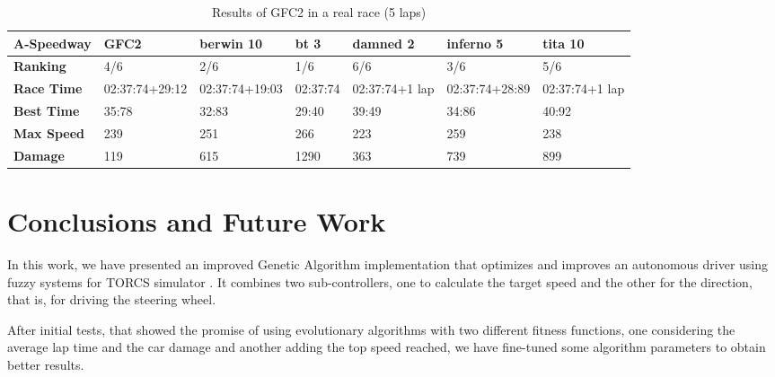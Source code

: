\documentclass[conference]{IEEEtran}
\begin{document}
\begin{table}[!ht]
	\centering
	{\scriptsize
		\caption{Results of GFC2 in a real race (5 laps)}
		\label{tab:gfc2real2}
		\begin{tabular}{|p{2 cm}|p{1.5 cm}|p{1.5 cm}|p{1.5 cm}|p{1.5 cm}|p{1.5 cm}|p{1.5 cm}|}
			\hline \textbf{A-Speedway} & \textbf{GFC2}&\textbf{berwin 10} & \textbf{bt 3} &\textbf{damned 2} & \textbf{inferno 5} & \textbf{tita 10}  \\
			\hline \textbf{Ranking} & 4/6&2/6&1/6&6/6&3/6&5/6\\			
			\hline \textbf{Race Time}	& 02:37:74\newline +29:12&  02:37:74\newline +19:03&02:37:74&02:37:74\newline+1 lap&02:37:74\newline+28:89&02:37:74\newline+1 lap\\	
			\hline \textbf{Best Time}& 35:78 &32:83&29:40&39:49&34:86&40:92\\	
			\hline \textbf{Max Speed}& 239&251&266&223&259&238\\	
			\hline \textbf{Damage}& 119& 615&1290 &363&739&899\\	
			\hline 
		\end{tabular}
	}
\end{table} 


\section{Conclusions and Future Work} 
\label{sec:conclusions}

In this work, we have presented an improved Genetic Algorithm implementation that optimizes and improves an autonomous driver using fuzzy systems for TORCS simulator \cite{evo17}. It combines two sub-controllers, one to calculate the target speed and the other for the direction, that is, for driving the steering wheel.

After initial tests, that showed the promise of using evolutionary algorithms with two different fitness functions, one considering the average lap time and the car damage and another adding the top speed reached, we have fine-tuned some algorithm parameters to obtain better results. %
\end{document}

